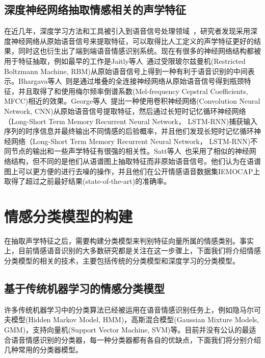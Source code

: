 \subsection{深度神经网络抽取情感相关的声学特征}
\label{ssec:dnn_extract}
在近几年，深度学习方法和工具被引入到语音信号处理领域~\cite{Han2014Speech, Lee2015High, Huang2014Speech, Le2013Emotion, Rana2016Emotion, Chernykh2017Emotion}，研究者发现采用深度神经网络从原始语音信号来提取特征，可以取得比人工定义的声学特征更好的结果，同时这也衍生出了端到端语音情感识别系统。现在有很多的神经网络结构都被用于特征抽取，例如最早的工作是Jaitly等人~\cite{Jaitly2011Learning}通过受限玻尔兹曼机(Restricted Boltzmann Machine, RBM)从原始语音信号上得到一种有利于语音识别的中间表示。Bhargava等人~\cite{Bhargava2015Architectures}则是通过堆叠的全连接神经网络从原始语音信号得到瓶颈特征，并且取得了和使用梅尔频率倒谱系数(Mel-frequency Cepstral Coefficients, MFCC)相近的效果。George等人~\cite{Trigeorgis2016Adieu}提出一种使用卷积神经网络(Convolution Neural Network, CNN)从原始语音信号提取特征，然后通过长短时记忆循环神经网络（Long-Short Term Memory Recurrent Neural Network， LSTM-RNN)捕获输入序列的时序信息并最终输出不同情感的后验概率，并且他们发现长短时记忆循环神经网络（Long-Short Term Memory Recurrent Neural Network， LSTM-RNN)不同节点的输出和一些声学特征有很强的相关性。Satt等人~\cite{Satt2017Efficient}也采用了相似的神经网络结构，但不同的是他们从语谱图上抽取特征而非原始语音信号。他们认为在语谱图上可以更方便的进行去噪的操作，并且他们在公开情感语音数据集IEMOCAP上取得了超过之前最好结果(state-of-the-art)的准确率。

\section{情感分类模型的构建}
\label{sec:emotion_cls}

在抽取声学特征之后，需要构建分类模型来判别特征向量所属的情感类别。事实上，目前情感语音识别的大多数研究都是关注在这一步骤上，下面我们将介绍情感分类模型的相关的技术，主要包括传统的分类模型和深度学习的分类模型。

\subsection{基于传统机器学习的情感分类模型}
\label{ssec:traditional_cls}

许多传统机器学习中的分类算法已经被运用在语音情感识别任务上，例如隐马尔可夫模型(Hidden Markov Model, HMM)，高斯混合模型(Gaussian Mixture Models, GMM)，支持向量机(Support Vector Machine, SVM)等。目前并没有公认的最适合语音情感识别的分类器，每一种分类器都有各自的优缺点，下面我们将分别介绍几种常用的分类器模型。

